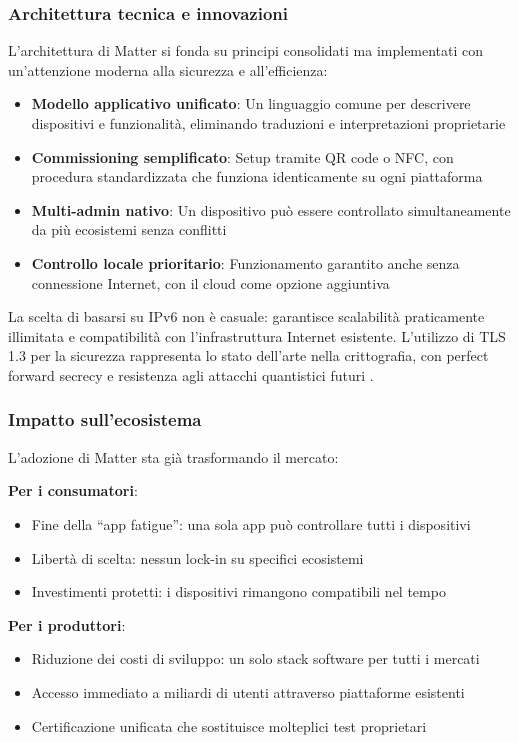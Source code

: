 \subsubsection{Architettura tecnica e innovazioni}

L'architettura di Matter si fonda su principi consolidati ma implementati con un'attenzione moderna alla sicurezza e all'efficienza:

\begin{itemize}
    \item \textbf{Modello applicativo unificato}: Un linguaggio comune per descrivere dispositivi e funzionalità, eliminando traduzioni e interpretazioni proprietarie
    \item \textbf{Commissioning semplificato}: Setup tramite QR code o NFC, con procedura standardizzata che funziona identicamente su ogni piattaforma
    \item \textbf{Multi-admin nativo}: Un dispositivo può essere controllato simultaneamente da più ecosistemi senza conflitti
    \item \textbf{Controllo locale prioritario}: Funzionamento garantito anche senza connessione Internet, con il cloud come opzione aggiuntiva
\end{itemize}

La scelta di basarsi su IPv6 non è casuale: garantisce scalabilità praticamente illimitata e compatibilità con l'infrastruttura Internet esistente. L'utilizzo di TLS 1.3 per la sicurezza rappresenta lo stato dell'arte nella crittografia, con perfect forward secrecy e resistenza agli attacchi quantistici futuri \parencite{matterCSA}.

\subsubsection{Impatto sull'ecosistema}

L'adozione di Matter sta già trasformando il mercato:

\textbf{Per i consumatori}:
\begin{itemize}
    \item Fine della ``app fatigue'': una sola app può controllare tutti i dispositivi
    \item Libertà di scelta: nessun lock-in su specifici ecosistemi
    \item Investimenti protetti: i dispositivi rimangono compatibili nel tempo
\end{itemize}

\textbf{Per i produttori}:
\begin{itemize}
    \item Riduzione dei costi di sviluppo: un solo stack software per tutti i mercati
    \item Accesso immediato a miliardi di utenti attraverso piattaforme esistenti
    \item Certificazione unificata che sostituisce molteplici test proprietari
\end{itemize}

